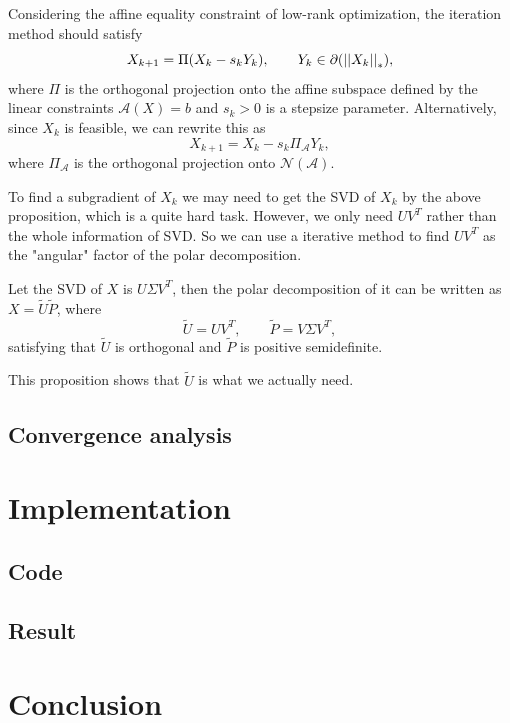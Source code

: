 \documentclass[11pt]{article}
\begin{document}
Considering the affine equality constraint of low-rank optimization, the iteration method should satisfy
\[X_{k+1}= \Pi(X_k-s_k Y_k), \qquad Y_k \in \partial (\left|\left|X_k\right|\right|_*),\]
where \(\Pi\) is the orthogonal projection onto the affine subspace defined by the linear constraints \(\mathcal{A}(X)=b\) and \(s_{k}>0\) is a stepsize parameter. Alternatively, since \(X_{k}\) is feasible, we can rewrite this as
\[
X_{k+1}=X_{k}-s_{k} \Pi_{\mathcal{A}} Y_{k},
\]
where \(\Pi_{\mathcal{A}}\) is the orthogonal projection onto \(\mathcal{N}(\mathcal{A})\).

To find a subgradient of \(X_k\) we may need to get the SVD of \(X_k\) by the above proposition, which is a quite hard task. However, we only need \(UV^T\) rather than the whole information of SVD. So we can use a iterative method to find \(UV^T\) as the "angular" factor of the polar decomposition.

\begin{proposition}
    Let the SVD of \(X\) is \(U\Sigma V^T\), then the polar decomposition of it can be written as \(X=\tilde{U} \tilde{P}\), where
    \[\tilde{U}=U V^T,\qquad \tilde{P}=V\Sigma V^T,\]
    satisfying that \(\tilde{U}\) is orthogonal and \(\tilde{P}\) is positive semidefinite.
\end{proposition}

This proposition shows that \(\tilde{U}\) is what we actually need.
\subsection{Convergence analysis}

\section{Implementation}

\subsection{Code}

\subsection{Result}

\section{Conclusion}




\end{document}
